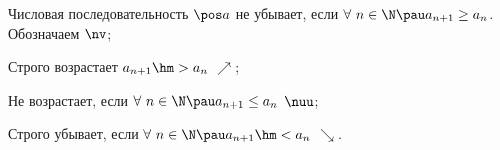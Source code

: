 
Числовая последовательность $\pos a$ не убывает, если $\forall\  n\in\N\pau a_{n+1}\geq a_n$. Обозначаем $\nv$;

Строго возрастает $a_{n+1}\hm>a_n$ $\nearrow$;

Не возрастает, если $\forall\  n\in\N\pau a_{n+1}\leq a_n$ $\nuu$;

Строго убывает, если $\forall\  n\in\N\pau a_{n+1}\hm<a_n$ $\searrow$.
